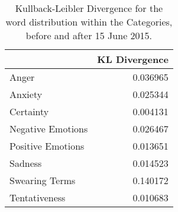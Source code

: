 \begin{table}[h]\centering
	\begin{tabular}{lr}
	\toprule
	{} &  KL Divergence \\
	\midrule
	Anger             &       0.036965 \\
	Anxiety           &       0.025344 \\
	Certainty         &       0.004131 \\
	Negative Emotions &       0.026467 \\
	Positive Emotions &       0.013651 \\
	Sadness           &       0.014523 \\
	Swearing Terms    &       0.140172 \\
	Tentativeness     &       0.010683 \\
	\bottomrule
	\end{tabular}
	
\caption{Kullback-Leibler Divergence for the word distribution within the Categories, before and after 15 June 2015.}
	\label{fig: Kullback_1}
\end{table}

